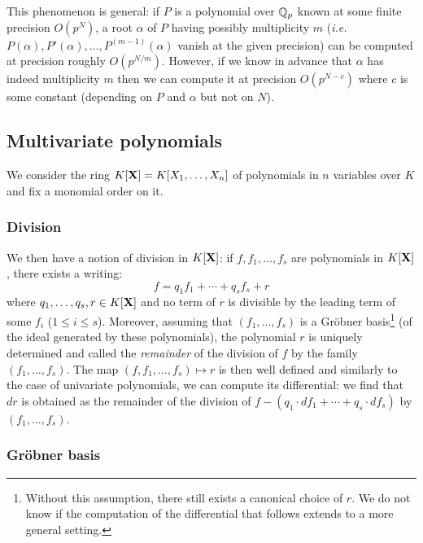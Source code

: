 \documentclass{lms}
\begin{document}
This phenomenon is general: if $P$ is a polynomial over $\mathbb Q_p$ known at 
some finite precision $O(p^N)$, a root $\alpha$ of $P$ having possibly 
multiplicity $m$ (\emph{i.e.} $P(\alpha), P'(\alpha), \ldots, P^{(m-1)} 
(\alpha)$ vanish at the given precision) can be computed at precision 
roughly $O(p^{N/m})$. However, if we know in advance that $\alpha$ has 
indeed multiplicity $m$ then we can compute it at precision $O(p^{N-c})$ 
where $c$ is some constant (depending on $P$ and $\alpha$ but not on
$N$).

\subsection{Multivariate polynomials}

We consider the ring $K[\mathbf X] = K[X_1, \ldots, X_n]$ of polynomials in $n$
variables over $K$ and fix a monomial order on it. 

\subsubsection*{Division}

We then have a notion of division in $K[\mathbf X]$: if $f, f_1, \ldots, f_s$ 
are polynomials in $K[\mathbf X]$, there exists a writing:
$$f = q_1 f_1 + \cdots + q_s f_s + r$$
where $q_1, \ldots, q_s, r \in K[\mathbf X]$ and no term of $r$ is divisible
by the leading term of some $f_i$ ($1 \leq i \leq s$). Moreover, assuming
that $(f_1, \ldots, f_s)$ is a Gr\"obner basis\footnote{Without this
assumption, there still exists a canonical choice of $r$. We do not know
if the computation of the differential that follows extends to a more
general setting.} (of the ideal generated by these polynomials), the 
polynomial $r$ is uniquely determined and called the \emph{remainder} of 
the division of $f$ by the family $(f_1, \ldots, f_s)$. The map 
$(f, f_1, \ldots, f_s) \mapsto r$ is then well defined and similarly to 
the case of univariate polynomials, we can compute its differential: we 
find that $dr$ is obtained as the remainder of the division of $f - (q_1 
\cdot d f_1 + \cdots + q_s \cdot d f_s)$ by $(f_1, \ldots, f_s)$.

\subsubsection*{Gr\"obner basis}
\end{document}
